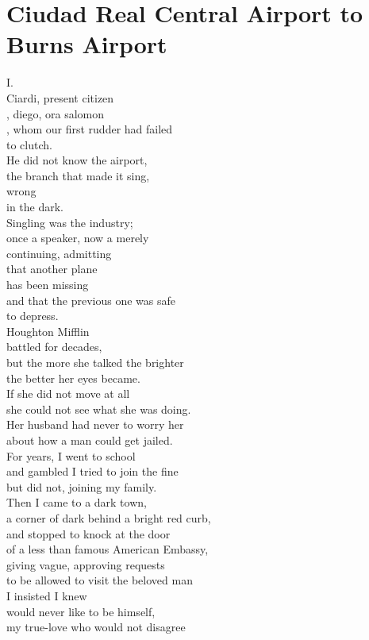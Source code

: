 \documentclass[smalldemyvopaper,11pt,twoside,onecolumn,openright,extrafontsizes]{memoir}
\begin{document}
\chapter{Ciudad Real Central Airport to Burns Airport}
I.
\\Ciardi, present citizen
\\, diego, ora salomon
\\, whom our first rudder had failed
\\to clutch.
\\He did not know the airport,
\\the branch that made it sing,
\\wrong
\\in the dark.
\\Singling was the industry;
\\once a speaker, now a merely
\\continuing, admitting
\\that another plane
\\has been missing
\\and that the previous one was safe
\\to depress.
\\Houghton Mifflin
\\battled for decades,
\\but the more she talked the brighter
\\the better her eyes became.
\\If she did not move at all
\\she could not see what she was doing.
\\Her husband had never to worry her
\\about how a man could get jailed.
\\For years, I went to school
\\and gambled I tried to join the fine
\\but did not, joining my family.
\\Then I came to a dark town,
\\a corner of dark behind a bright red curb,
\\and stopped to knock at the door
\\of a less than famous American Embassy,
\\giving vague, approving requests
\\to be allowed to visit the beloved man
\\I insisted I knew
\\would never like to be himself,
\\my true-love who would not disagree
\end{document}
